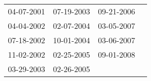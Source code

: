 \begin{supertabular}{llll}
 04-07-2001 &  07-19-2003 &  09-21-2006 \\
 04-04-2002 &  02-07-2004 &  03-05-2007 \\
 07-18-2002 &  10-01-2004 &  03-06-2007 \\
 11-02-2002 &  02-25-2005 &  09-01-2008 \\
 03-29-2003 &  02-26-2005 &             \\
\end{supertabular}
